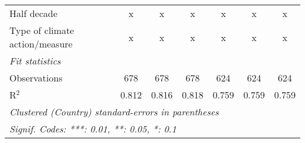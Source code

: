 \begin{tabular}{lcccccc}
   Half decade                                         & x       & x             & x             & x             & x             & x\\  
   Type of climate action/measure                      & x       & x             & x             & x             & x             & x\\  
   \midrule \emph{Fit statistics}\\
   Observations                                        & 678     & 678           & 678           & 624           & 624           & 624\\  
   R$^2$                                               & 0.812   & 0.816         & 0.818         & 0.759         & 0.759         & 0.759\\  
   \midrule
   \multicolumn{7}{l}{\emph{Clustered (Country) standard-errors in parentheses}}\\
   \multicolumn{7}{l}{\emph{Signif. Codes: ***: 0.01, **: 0.05, *: 0.1}}\\
\end{tabular}
\par\endgroup


